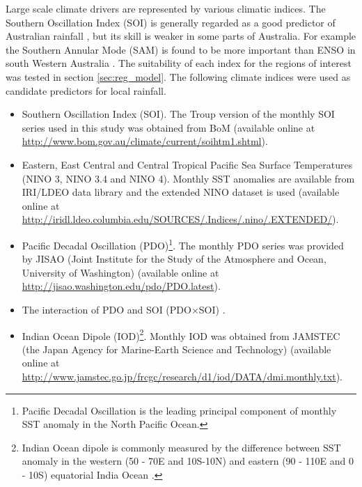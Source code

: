 \documentclass[draft,linenumbers]{agujournal}
\begin{document}
\begin{article}
Large scale climate drivers are represented by various climatic indices. The Southern Oscillation Index (SOI) is generally regarded as a good predictor of Australian rainfall \citep{Risbey2009,Chowdhury2010,Westra2010}, but its skill is weaker in some parts of Australia. For example the Southern Annular Mode (SAM) is found to be more important than ENSO in south Western Australia \citep{Meneghini2007}. The suitability of each index for the regions of interest was tested in section \ref{sec:reg_model}. The following climate indices were used as candidate predictors for local rainfall. 
\begin{itemize}
  \item Southern Oscillation Index (SOI). The Troup version of the monthly SOI series used in this study was obtained from BoM (available online at \url{http://www.bom.gov.au/climate/current/soihtm1.shtml}).
  \item Eastern, East Central and Central Tropical Pacific Sea Surface Temperatures (NINO 3, NINO 3.4 and NINO 4). Monthly SST anomalies are available from IRI/LDEO data library and the extended NINO dataset is used (available online at \url{http://iridl.ldeo.columbia.edu/SOURCES/.Indices/.nino/.EXTENDED/}).
  \item Pacific Decadal Oscillation (PDO)\footnote{Pacific Decadal Oscillation is the leading principal component of monthly SST anomaly in the North Pacific Ocean.}. The monthly PDO series was provided by JISAO (Joint Institute for the Study of the Atmosphere and Ocean, University of Washington) (available online at \url{http://jisao.washington.edu/pdo/PDO.latest}).
  \item The interaction of PDO and SOI (PDO$\times$SOI) \citep{Kamruzzaman2011}.
  \item Indian Ocean Dipole (IOD)\footnote{Indian Ocean dipole is commonly measured by the difference between SST anomaly in the western (50 - 70\textdegree E and 10\textdegree S-10\textdegree N) and eastern (90 - 110\textdegree E and 0 - 10\textdegree S) equatorial India Ocean \citep{Saji1999}.}. Monthly IOD was obtained from JAMSTEC (the Japan Agency for Marine-Earth Science and Technology) (available online at \url{http://www.jamstec.go.jp/frcgc/research/d1/iod/DATA/dmi.monthly.txt}).
\end{itemize}




\end{article}
\end{document}
